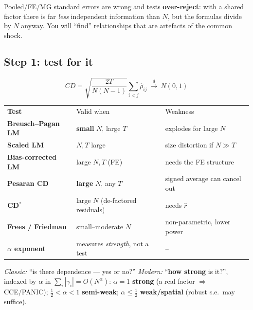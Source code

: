 \documentclass[11pt,a4paper]{article}
\newcommand{\hlt}[2]{\textcolor{#1}{\textbf{#2}}}
\begin{document}
\begin{avoidbox}
Pooled/FE/MG standard errors are wrong and tests \textbf{over-reject}: with a shared factor there
is far \emph{less} independent information than $N$, but the formulas divide by $N$ anyway. You
will ``find'' relationships that are artefacts of the common shock.
\end{avoidbox}

\subsection{Step 1: test for it}
\begin{eqbox}
\[ CD=\sqrt{\frac{2T}{N(N-1)}}\sum_{i<j}\hat\rho_{ij}\ \xrightarrow{d}\ N(0,1) \]
\end{eqbox}
\begin{center}
\begin{tabular}{@{}>{\bfseries}l p{6.0cm} p{5.2cm}@{}}
\rowcolor{ccyan}\color{white}Test & \color{white}Valid when & \color{white}Weakness\\
Breusch--Pagan LM & \textbf{small} $N$, large $T$ & explodes for large $N$\\
Scaled LM & $N,T$ large & size distortion if $N\gg T$\\
Bias-corrected LM & large $N,T$ (FE) & needs the FE structure\\
\textbf{Pesaran CD} & \textbf{large} $N$, any $T$ & signed average can cancel out\\
CD$^*$ & large $N$ (de-factored residuals) & needs $\hat r$\\
Frees / Friedman & small--moderate $N$ & non-parametric, lower power\\
$\alpha$ exponent & measures \emph{strength}, not a test & --\\
\end{tabular}
\end{center}

\begin{begbox}
\emph{Classic:} ``is there dependence --- yes or no?''\quad
\emph{Modern:} ``\textbf{how strong} is it?'', indexed by $\alpha$ in $\sum_i|\gamma_i|=O(N^\alpha)$:
$\alpha=1$ \hlt{cred}{strong} (a real factor $\Rightarrow$ CCE/PANIC);
$\tfrac12<\alpha<1$ \hlt{camber}{semi-weak}; $\alpha\le\tfrac12$ \hlt{cgreen}{weak/spatial}
(robust s.e.\ may suffice).
\end{begbox}
\end{document}
